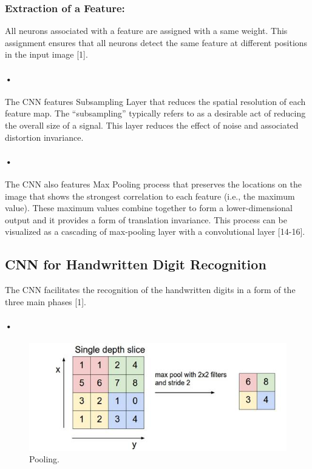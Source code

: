 \documentclass{article}
\begin{document}
\subsubsection{Extraction of a Feature: }
All neurons associated with a feature are assigned with a same weight. This assignment ensures that all neurons detect the same feature at different positions in the input image [1]. 
\paragraph{•}
The CNN features Subsampling Layer that reduces the spatial resolution of each feature map. The “subsampling” typically refers to as a desirable act of reducing the overall size of a signal. This layer reduces the effect of noise and associated distortion invariance. 
\paragraph{•}
The CNN also features Max Pooling process that preserves the locations on the image that shows the strongest correlation to each feature (i.e., the maximum value). These maximum values combine together to form a lower-dimensional output and it provides a form of translation invariance. This process can be visualized as a cascading of max-pooling layer with a convolutional layer [14-16].

 
 
\subsection{CNN for Handwritten Digit Recognition }
The CNN facilitates the recognition of the handwritten digits in a form of the three main phases [1]. 
\paragraph{•}
\begin{figure}
  \includegraphics[width=\linewidth]{Pooling.png}
  \caption{Pooling.}
  \label{fig:Pooling}
\end{figure}
\end{document}
